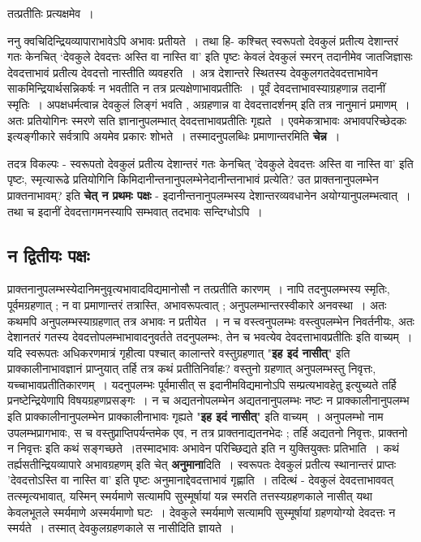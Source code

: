 {तत्प्रतीतिः प्रत्यक्षमेव~। 

ननु क्वचिदिन्द्रियव्यापाराभावेऽपि अभावः प्रतीयते~। तथा हि- कश्चित् स्वरूपतो देवकुलं प्रतीत्य देशान्तरं गतः केनचित् ‘देवकुले देवदत्तः अस्ति वा नास्ति वा’ इति पृष्टः केवलं देवकुलं स्मरन् तदानीमेव जातजिज्ञासः देवदत्ताभावं प्रतीत्य देवदत्तो नास्तीति व्यवहरति~। अत्र देशान्तरे स्थितस्य देवकुलगतदेवदत्ताभावेन साकमिन्द्रियार्थसन्निकर्षः न भवतीति न तत्र प्रत्यक्षेणाभावप्रतीतिः~। पूर्वं देवदत्ताभावस्याग्रहणान्न तदानीं स्मृतिः~। अपक्षधर्मत्वान्न देवकुलं लिङ्गं भवति , अग्रहणान्न वा देवदत्तादर्शनम् इति तत्र नानुमानं प्रमाणम्~। अतः प्रतियोगिनः स्मरणे सति ज्ञानानुपलम्भात् देवदत्ताभावप्रतीतिः गृह्यते~। एवमेकत्राभावः अभावपरिच्छेदकः इत्यङ्गीकारे सर्वत्रापि अयमेव प्रकारः शोभते~। तस्मादनुपलब्धिः प्रमाणान्तरमिति \textbf{चेन्न}~। 

तदत्र विकल्पः - स्वरूपतो देवकुलं प्रतीत्य देशान्तरं गतः केनचित् 'देवकुले देवदत्तः अस्ति वा नास्ति वा' इति पृष्टः, स्मृत्यारूढे प्रतियोगिनि किमिदानीन्तनानुपलम्भेने\-दानीन्तनाभावं प्रत्येति? उत प्राक्तनानुपलम्भेन प्राक्तनाभावम्? इति \textbf{चेत् न प्रथमः पक्षः} - इदानीन्तनानुपलम्भस्य देशान्तरव्यवधानेन अयोग्यानुपलम्भत्वात्~। तथा च इदानीं देवदत्तागमनस्यापि सम्भवात् तदभावः सन्दिग्धोऽपि~। 
\vskip -30pt

\subsection*{न द्वितीयः पक्षः} 
\vskip -6pt

प्राक्तनानुपलम्भस्येदानिमनुवृत्यभावादविद्यमानोसौ न तत्प्रतीति कारणम्~। नापि तदनु\-\break पलम्भस्य स्मृतिः, पूर्वमग्रहणात् ; न वा प्रमाणान्तरं तत्रास्ति, अभावरूपत्वात् ; अनुपलम्भान्त\-रस्वीकारे अनवस्था~। अतः कथमपि अनुपलम्भस्याग्रहणात् तत्र अभावः न प्रतीयेत~। न च वस्त्वनुपलम्भः वस्त्वुपलम्भेन निवर्तनीयः, अतः देशानतरं गतस्य देवदत्तोपलम्भाभावादनुवर्तते तदनुपलम्भः, तेन च भवत्येव देवदत्ताभावप्रतीतिः इति वाच्यम्~। यदि स्वरूपतः अधिकरणमात्रं गृहीत्वा पश्चात् कालान्तरे वस्तुग्रहणात् "\textbf{इह इदं नासीत्}" इति प्राक्कालीनाभावज्ञानं प्राप्नुयात् तर्हि तत्र कथं प्रतीतिनिर्वाहः? वस्तुनो ग्रहणात् अनुपलम्भस्तु निवृत्तः, यच्चाभावप्रतीतिकारणम्~। यदनुपलम्भः पूर्वमासीत् स इदानीमविद्यमानोऽपि सम्प्रत्यभावहेतु इत्युच्यते तर्हि प्रनष्टेन्द्रियेणापि विषयग्रहणप्रसङ्गः~। न च अद्यतनोपलम्भेन अद्यतनानुपलम्भः नष्टः न प्राक्कालीनानुपलम्भ इति प्राक्कालीनानुपलम्भेन प्राक्कालीनाभावः गृह्यते "\textbf{इह इदं \-नासीत्}" इति वाच्यम्~। अनुपलम्भो नाम उपलम्भप्रागभावः, स च वस्तुप्राप्तिपर्यन्तमेक एव, न तत्र प्राक्तनाद्यतनभेदः ; तर्हि अद्यतनो निवृत्तः, प्राक्तनो न निवृत्तः इति कथं सङ्गच्छते~।\break तस्मादभावः अभावेन परिच्छिद्यते इति न युक्तियुक्तः प्रतिभाति~। कथं तर्ह्यसतीन्द्रियव्यापारे अभावग्रहणम् इति चेत् \textbf{अनुमाना}दिति~। स्वरूपतः देवकुलं प्रतीत्य स्थानान्तरं प्राप्तः 'देवदत्तोऽस्ति वा नास्ति वा' इति पृष्टः अनुमानाद्देवदत्ताभावं गृह्णाति~। तदित्थं - देवकुलं देव\-दत्ताभाववत् तत्स्मृत्यभावात्, यस्मिन् स्मर्यमाणे सत्यामपि सुस्मूर्षायां यन्न स्मरति तत्तस्य\break ग्रहणकाले नासीत् यथा केवलभूतले स्मर्यमाणे अस्मर्यमाणो घटः~। देवकुले स्मर्यमाणे सत्या\-मपि सुस्मूर्षायां ग्रहणयोग्यो देवदत्तः न स्मर्यते~। तस्मात् देवकुलग्रहणकाले स नासीदिति \-ज्ञायते~। 

}
